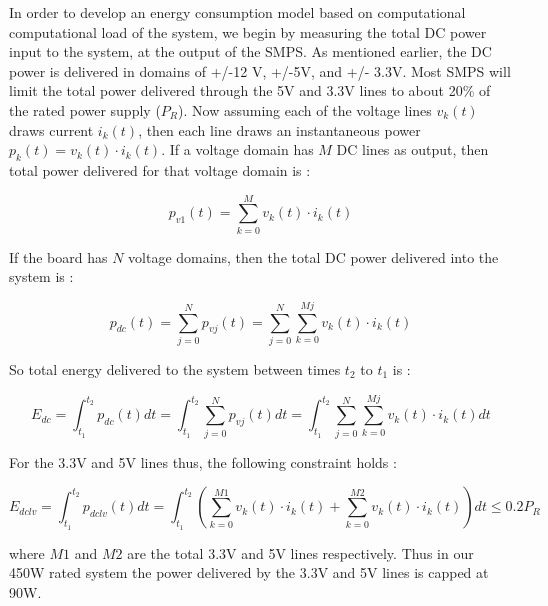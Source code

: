 \documentclass[times, 10pt,onecolumn]{article}
\begin{document}
In order to develop an energy consumption model based on computational
computational load of the system, we begin by measuring the total DC
power input to the system, at the output of the SMPS. As mentioned
earlier, the DC power is delivered in domains of +/-12 V, +/-5V, and +/-
3.3V. Most SMPS will limit the total power delivered through the 5V and
3.3V lines to about 20\% of the rated power supply ($P_R$). Now assuming
each of the voltage lines $v_k(t)$ draws current $i_k(t)$, then each
line draws an instantaneous power $p_k(t) = v_k(t)\cdot i_k(t)$. If a
voltage domain has $M$ DC lines as output, then total power delivered
for that voltage domain is :
  
\begin{equation}
\label{eq:power_vdomain}
p_{v1}(t)=  \sum_{k=0}^{M} v_k(t)\cdot i_k(t)
\end{equation}

If the board has $N$ voltage domains, then the total DC power delivered
into the system is :

\begin{equation}
\label{eq:power_vtot}
p_{dc}(t) = \sum_{j=0}^{N} p_{vj}(t)=  \sum_{j=0}^{N} \sum_{k=0}^{Mj} v_{k}(t)\cdot i_{k}(t)
\end{equation}

So total energy delivered to the system between times $t_2$ to $t_1$ is :

\begin{equation}
\label{eq:energy_vtot}
E_{dc} = \int_{t_1}^{t_2} p_{dc}(t) dt = \int_{t_1}^{t_2} \sum_{j=0}^{N} p_{vj}(t) dt = \int_{t_1}^{t_2} \sum_{j=0}^{N} \sum_{k=0}^{Mj} v_{k}(t)\cdot i_{k}(t) dt
\end{equation}

For the 3.3V and 5V lines thus, the following constraint holds :

\begin{equation}
\label{eq:power_constr}
E_{dclv} = \int_{t_1}^{t_2} p_{dclv} (t) dt =  \int_{t_1}^{t_2} ( \sum_{k=0}^{M1} v_{k}(t)\cdot i_{k}(t) + \sum_{k=0}^{M2} v_{k}(t)\cdot i_{k}(t) ) dt  \leq 0.2 P_R
\end{equation}

where $M1$ and $M2$ are the total 3.3V and 5V lines respectively. Thus in our 450W rated system the power
delivered by the 3.3V and 5V lines is capped at 90W. 
\end{document}
